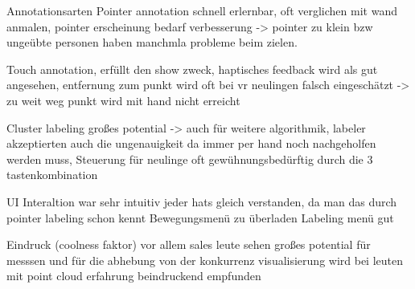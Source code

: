 Annotationsarten
Pointer annotation schnell erlernbar, oft verglichen mit wand anmalen, pointer erscheinung bedarf verbesserung -> pointer zu klein bzw ungeübte personen haben manchmla probleme beim zielen.

Touch annotation, erfüllt den show zweck, haptisches feedback wird als gut angesehen, entfernung zum punkt wird oft bei vr neulingen falsch eingeschätzt -> zu weit weg punkt wird mit hand nicht erreicht

Cluster labeling
großes potential -> auch für weitere algorithmik, labeler akzeptierten auch die ungenauigkeit da immer per hand noch nachgeholfen werden muss, Steuerung für neulinge oft gewühnungsbedürftig durch die 3 tastenkombination

UI
Interaltion war sehr intuitiv jeder hats gleich verstanden, da man das durch pointer labeling schon kennt
Bewegungsmenü zu überladen
Labeling menü gut

Eindruck (coolness faktor)
vor allem sales leute sehen großes potential für messsen und für die abhebung von der konkurrenz
visualisierung wird bei leuten mit point cloud erfahrung beindruckend empfunden




